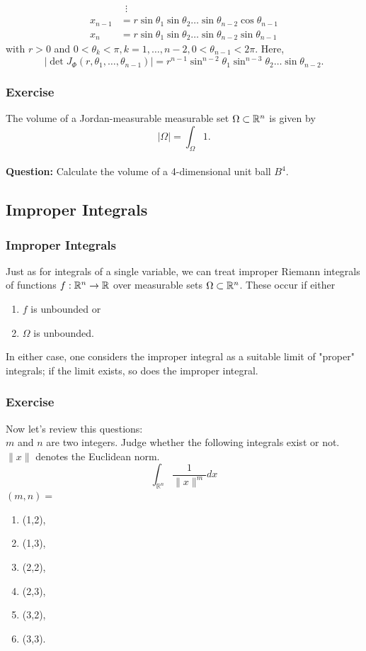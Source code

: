 \documentclass[12pt, t]{beamer}
\newcommand{\nullspace}{~\\[15pt]}
\newcommand{\Question}{\textbf{Question: }}
\begin{document}
\begin{frame}[allowframebreaks]
\begin{itemize}
\begin{align*}
                          & \,\,\,\vdots                                                     \\
                  x_{n-1} & =r\sin\theta_1\sin\theta_2\ldots\sin\theta_{n-2}
                  \cos\theta_{n-1}                                                           \\
                  x_n     & =r\sin\theta_1\sin\theta_2\ldots\sin\theta_{n-2}\sin\theta_{n-1}
              \end{align*}
              with $r>0$ and $0<\theta_k<\pi,k=1,\ldots,n-2,0<\theta_{n-1}<2\pi$. Here,
              \[|\det J_\Phi(r,\theta_1,\ldots,\theta_{n-1})|=r^{n-1}\sin^{n-2}\theta_1
                  \sin^{n-3}\theta_2\ldots\sin\theta_{n-2}.\]
    \end{itemize}
\end{frame}

\begin{frame}
    \frametitle{Exercise}
    The volume of a Jordan-measurable measurable set $\Omega\subset\mathbb{R}^n$ is given by
    \[|\Omega|=\int_\Omega1.\]
    \nullspace
    \Question Calculate the volume of a 4-dimensional unit ball $B^4$.

\end{frame}

\subsection{Improper Integrals}
\begin{frame}
    \frametitle{Improper Integrals}
    Just as for integrals of a single variable, we can treat improper Riemann
    integrals of functions $f:\mathbb{R}^n\to\mathbb{R}$ over measurable sets $\Omega\subset\mathbb{R}^n$. These occur if either
    \begin{enumerate}[1.]
        \item $f$ is unbounded or
        \item $\Omega$ is unbounded.
    \end{enumerate}
    In either case, one considers the improper integral as a suitable limit of
    "proper" integrals; if the limit exists, so does the improper integral.\\[5pt]
\end{frame}

\begin{frame}
    \frametitle{Exercise}
    Now let's review this questions:\\
    $m$ and $n$ are two integers. Judge whether the following integrals exist or not. $\|x\|$ denotes the Euclidean norm.
    \[
        \int_{\mathbb{R}^{n}} \frac{1}{\|x\|^{m}} d x
    \]
    $(m, n)=$
    \begin{enumerate}
        \item (1,2),
        \item (1,3),
        \item (2,2),
        \item (2,3),
        \item (3,2),
        \item (3,3).
    \end{enumerate}
\end{frame}
\end{document}

